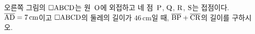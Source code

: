 \noindent\begin{minipage}[t]{0.58\linewidth}\vspace{0pt}\raggedright 오른쪽 그림의 $\square\mathrm{ABCD}$는 원~$\mathrm{O}$에 외접하고 네 점~$\mathrm{P}$, $\mathrm{Q}$, $\mathrm{R}$, $\mathrm{S}$는 접점이다. $\overline{\mathrm{AD}}=7\,\mathrm{cm}$이고 $\square\mathrm{ABCD}$의 둘레의 길이가 $46\,\mathrm{cm}$일 때, $\overline{\mathrm{BP}}+\overline{\mathrm{CR}}$의 길이를 구하시오.\end{minipage}\hfill\begin{minipage}[t]{0.4\linewidth}\vspace{0pt}\centering \resizebox{\ifdim\width>\linewidth\linewidth\else\width\fi}{!}{}\end{minipage}\par

